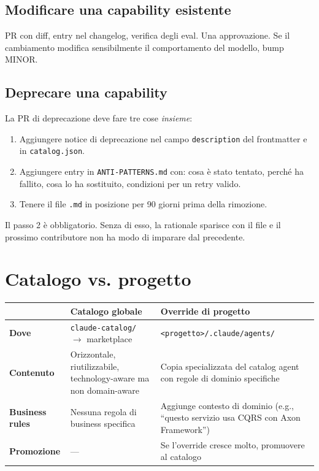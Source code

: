 \documentclass[12pt,a4paper,twoside]{book}
\begin{document}
\subsection{Modificare una capability esistente}

PR con diff, entry nel changelog, verifica degli eval. Una approvazione. Se il cambiamento modifica sensibilmente il comportamento del modello, bump MINOR.

\subsection{Deprecare una capability}

La PR di deprecazione deve fare tre cose \textit{insieme}:
\begin{enumerate}
  \item Aggiungere notice di deprecazione nel campo \texttt{description} del frontmatter e in \texttt{catalog.json}.
  \item Aggiungere entry in \texttt{ANTI-PATTERNS.md} con: cosa è stato tentato, perché ha fallito, cosa lo ha sostituito, condizioni per un retry valido.
  \item Tenere il file \texttt{.md} in posizione per 90 giorni prima della rimozione.
\end{enumerate}

Il passo 2 è obbligatorio. Senza di esso, la rationale sparisce con il file e il prossimo contributore non ha modo di imparare dal precedente.

\section{Catalogo vs. progetto}

\begin{center}
\begin{tabular}{lp{5.5cm}p{5.5cm}}
\toprule
 & \textbf{Catalogo globale} & \textbf{Override di progetto} \\
\midrule
\textbf{Dove} & \texttt{claude-catalog/} $\rightarrow$ marketplace & \texttt{<progetto>/.claude/agents/} \\
\textbf{Contenuto} & Orizzontale, riutilizzabile, technology-aware ma non domain-aware & Copia specializzata del catalog agent con regole di dominio specifiche \\
\textbf{Business rules} & Nessuna regola di business specifica & Aggiunge contesto di dominio (e.g., ``questo servizio usa CQRS con Axon Framework'') \\
\textbf{Promozione} & — & Se l'override cresce molto, promuovere al catalogo \\
\bottomrule
\end{tabular}
\end{center}
\end{document}
